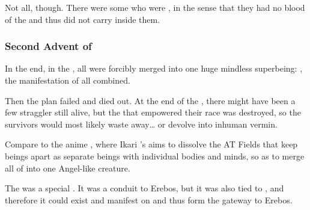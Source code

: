 Not all, though. 
There were some \humans who were , in the sense that they had no blood of the {} and thus did not carry \Lithrim inside them. 





\subsubsection{Second Advent of \Lithrim}
In the end, in the \thirdbanewar, all \humans{} were forcibly merged into one huge mindless superbeing:
\Lithrim, the manifestation of all \humanity{} combined. 
 
Then the plan failed and \humanity{} died out. 
At the end of the \thirdbanewar, there might have been a few straggler \humans{} still alive, but the \matrix{} that empowered their race was destroyed, so the survivors would most likely waste away\ldots{} or devolve into inhuman vermin. 

Compare to the anime \cite{Anime:NeonGenesisEvangelion}, where Ikari \Gendou's  aims to dissolve the AT Fields that keep \human{} beings apart as separate beings with individual bodies and minds, so as to merge all of \humanity{} into one Angel-like creature. 

The \Lithrim was a special . 
It was a conduit to Erebos, but it was also tied to \Miith, and therefore it could exist and manifest on \Miith and thus form the gateway to Erebos.






